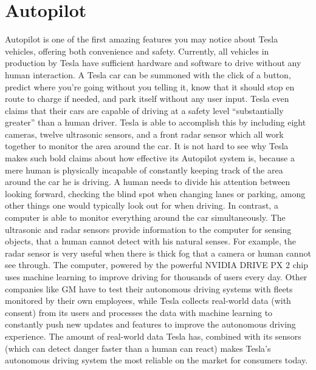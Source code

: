 \documentclass{article}
\begin{document}
  \section{Autopilot}
  Autopilot is one of the first amazing features you may notice about Tesla vehicles,
  offering both convenience and safety. Currently, all vehicles in production by Tesla
  have sufficient hardware and software to drive without any human interaction.
  A Tesla car can be summoned with the click of a button, predict where you're
  going without you telling it, know that it should stop en route to charge if needed,
  and park itself without any user input. Tesla even claims that their cars are capable of driving
  at a safety level ``substantially greater'' than a human driver\cite{allcarsautopilot}.
  Tesla is able to accomplish this by including eight cameras, twelve ultrasonic sensors, and a front radar
  sensor which all work together to monitor the area around the car. It is not hard
  to see why Tesla makes such bold claims about how effective its Autopilot system is,
  because a mere human is physically incapable of constantly keeping track of the area around
  the car he is driving. A human needs to divide his attention between looking forward,
  checking the blind spot when changing lanes or parking, among other things one would typically
  look out for when driving. In contrast, a computer is able to monitor everything
  around the car simultaneously. The ultrasonic and radar sensors
  provide information to the computer for sensing objects, that a human cannot
  detect with his natural senses. For example, the radar sensor is very useful when
  there is thick fog that a camera or human cannot see through. The computer, powered
  by the powerful NVIDIA DRIVE PX 2 chip uses machine learning to improve driving for
  thousands of users every day. Other companies like GM have to test their autonomous
  driving systems with fleets monitored by their own employees, while Tesla collects
  real-world data (with consent) from its users and processes the data with machine
  learning to constantly push new updates and features to improve the autonomous
  driving experience.\cite{tdata1}\cite{tdata2}\cite{tdata3}
  The amount of real-world data Tesla has, combined with its sensors (which can
  detect danger faster than a human can react\cite{predictcrash}) makes Tesla's
  autonomous driving system the most reliable on the market for consumers today.

\end{document}
